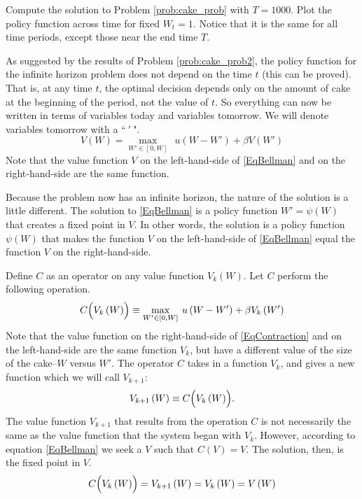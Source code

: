 \begin{problem}
\label{prob:cake_prob2}
Compute the solution to Problem \ref{prob:cake_prob} with $T = 1000$.  Plot the policy function across time for fixed $W_t = 1$.  Notice that it is the same for all time periods, except those near the end time $T$.
\end{problem}

As suggested by the results of Problem \ref{prob:cake_prob2},  the policy function for the infinite horizon problem does not depend on the time $t$ (this can be proved).  That is, at any time $t$, the optimal decision depends only on the amount of cake at the beginning of the period, not the value of $t$.  So everything can now be written in terms of variables today and variables tomorrow. We will denote variables tomorrow with a ``$\:'\:$".
\begin{equation}
\label{EqBellman}
V\left(W\right) = \max_{W'\in[0,W]}\:\: u\left(W - W'\right) + \beta V\left(W'\right)
\end{equation}
Note that the value function $V$ on the left-hand-side of \eqref{EqBellman} and on the right-hand-side are the same function.

Because the problem now has an infinite horizon, the nature of the solution is a little different. The solution to \eqref{EqBellman} is a policy function $W'=\psi(W)$ that creates a fixed point in $V$. In other words, the solution is a policy function $\psi(W)$ that makes the function $V$ on the left-hand-side of \eqref{EqBellman} equal the function $V$ on the right-hand-side.

Define $C$ as an operator on any value function $V_k\left(W\right)$. Let $C$ perform the following operation.
\begin{equation}
\label{EqContraction}
C\Bigl(V_k\left(W\right)\Bigr) \equiv \max_{W'\in[0,W]}\: u\left(W-W'\right) + \beta V_k\left(W'\right)
\end{equation}
Note that the value function on the right-hand-side of \eqref{EqContraction} and on the left-hand-side are the same function $V_k$, but have a different value of the size of the cake--$W$ versus $W'$. The operator $C$ takes in a function $V_k$, and gives a new function which we will call $V_{k+1}$:
\begin{equation*}
V_{k+1}\left(W\right) \equiv C\Bigl(V_k\left(W\right)\Bigr).
\end{equation*}
The value function $V_{k+1}$ that results from the operation $C$ is not necessarily the same as the value function that the system began with $V_k$. However, according to equation \eqref{EqBellman} we seek a $V$ such that $C(V) = V$.  The solution, then, is the fixed point in $V$.
\begin{equation*}
C\Bigl(V_k\left(W\right)\Bigr) = V_{k+1}\left(W\right) = V_k\left(W\right) = V\left(W\right)
\end{equation*}

